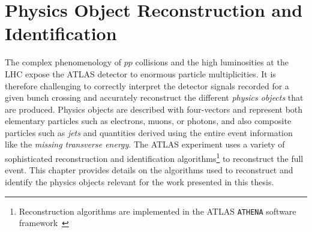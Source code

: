 
\chapter{Physics Object Reconstruction and Identification}
\label{chap:objects}

The complex phenomenology of $pp$ collisions and the high luminosities at the LHC expose the ATLAS detector to enormous particle multiplicities. It is therefore challenging to correctly interpret the detector signals recorded for a given bunch crossing and accurately reconstruct the different \emph{physics objects} that are produced.
Physics objects are described with four-vectors and represent both elementary particles such as electrons, muons, or photons, and also composite particles such as \emph{jets} and quantities derived using the entire event information like the \emph{missing transverse energy}.
The ATLAS experiment uses a variety of sophisticated reconstruction and identification algorithms\footnote{Reconstruction algorithms are implemented in the ATLAS \texttt{ATHENA} software framework~\cite{ATLAS-TDR-17}} to reconstruct the full event.
This chapter provides details on the algorithms used to reconstruct and identify the physics objects relevant for the work presented in this thesis.




